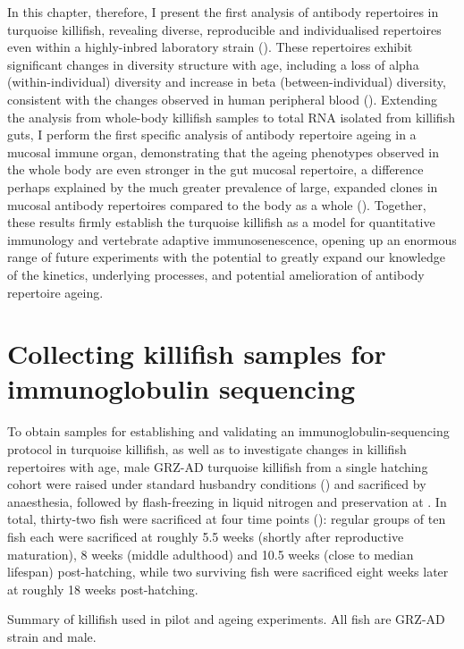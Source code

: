 In this chapter, therefore, I present the first analysis of antibody repertoires in turquoise killifish, revealing diverse, reproducible and individualised repertoires even within a highly-inbred laboratory strain (). These repertoires exhibit significant changes in diversity structure with age, including a loss of alpha (within-individual) diversity and increase in beta (between-individual) diversity, consistent with the changes observed in human peripheral blood (). Extending the analysis from whole-body killifish samples to total RNA isolated from killifish guts, I perform the first specific analysis of antibody repertoire ageing in a mucosal immune organ, demonstrating that the ageing phenotypes observed in the whole body are even stronger in the gut mucosal repertoire, a difference perhaps explained by the much greater prevalence of large, expanded clones in mucosal antibody repertoires compared to the body as a whole (). Together, these results firmly establish the turquoise killifish as a model for quantitative immunology and vertebrate adaptive immunosenescence, opening up an enormous range of future experiments with the potential to greatly expand our knowledge of the kinetics, underlying processes, and potential amelioration of antibody repertoire ageing.

\section{Collecting killifish samples for immunoglobulin sequencing}
\label{sec:igseq_samples}

To obtain samples for establishing and validating an immunoglobulin-sequencing protocol in turquoise killifish, as well as to investigate changes in killifish repertoires with age, male GRZ-AD turquoise killifish from a single hatching cohort were raised under standard husbandry conditions () and sacrificed by anaesthesia, followed by flash-freezing in liquid nitrogen and preservation at . In total, thirty-two fish were sacrificed at four time points (): regular groups of ten fish each were sacrificed at roughly 5.5 weeks (shortly after reproductive maturation), 8 weeks (middle adulthood) and 10.5 weeks (close to median lifespan) post-hatching, while two surviving fish were sacrificed eight weeks later at roughly 18 weeks post-hatching.

\begin{table}[b]
\caption[Summary of killifish used in \igseq pilot and ageing experiments]{Summary of killifish used in \igseq pilot and ageing experiments. All fish are GRZ-AD strain and male.}
\label{tab:igseq-cohorts-summary}

\end{table}

